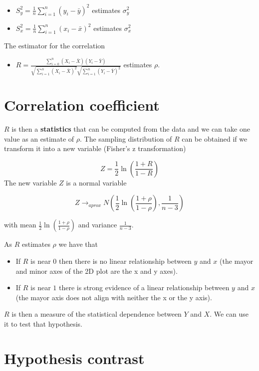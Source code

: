 \documentclass[
]{book}
\providecommand{\tightlist}{%
  \setlength{\itemsep}{0pt}\setlength{\parskip}{0pt}}
\begin{document}
\begin{itemize}
\tightlist
\item
  \(S^2_y=\frac{1}{n}\sum_{i=1}^n (y_i-\bar{y})^2\) estimates \(\sigma^2_y\)
\item
  \(S^2_x=\frac{1}{n}\sum_{i=1}^n (x_i-\bar{x})^2\) estimates \(\sigma^2_x\)
\end{itemize}

The estimator for the correlation

\begin{itemize}
\tightlist
\item
  \(R=\frac{\sum_{i=0}^n(X_i-\bar{X})(Y_i-\bar{Y})}{\sqrt{\sum_{i=1}^n(X_i-\bar{X})^2}\sqrt{\sum_{i=1}^n(Y_i-\bar{Y})^2}}\) estimates \(\rho\).
\end{itemize}

\hypertarget{correlation-coefficient}{%
\section{Correlation coefficient}\label{correlation-coefficient}}

\(R\) is then a \textbf{statistics} that can be computed from the data and we can take one value as an estimate of \(\rho\). The sampling distribution of \(R\) can be obtained if we transform it into a new variable (Fisher's z transformation)

\[Z=\frac{1}{2}\ln (\frac{1+R}{1-R})\]
The new variable \(Z\) is a normal variable

\[Z \rightarrow_{aprox} N(\frac{1}{2}\ln (\frac{1+\rho}{1-\rho}), \frac{1}{n-3})\]

with mean \(\frac{1}{2}\ln (\frac{1+\rho}{1-\rho})\) and variance \(\frac{1}{n-3}\).

As \(R\) estimates \(\rho\) we have that

\begin{itemize}
\item
  If \(R\) is near \(0\) then there is no linear relationship between \(y\) and \(x\) (the mayor and minor axes of the 2D plot are the x and y axes).
\item
  If \(R\) is near \(1\) there is strong evidence of a linear relationship between \(y\) and \(x\) (the mayor axis does not align with neither the x or the y axis).
\end{itemize}

\(R\) is then a measure of the statistical dependence between \(Y\) and \(X\). We can use it to test that hypothesis.

\hypertarget{hypothesis-contrast}{%
\section{Hypothesis contrast}\label{hypothesis-contrast}}
\end{document}
